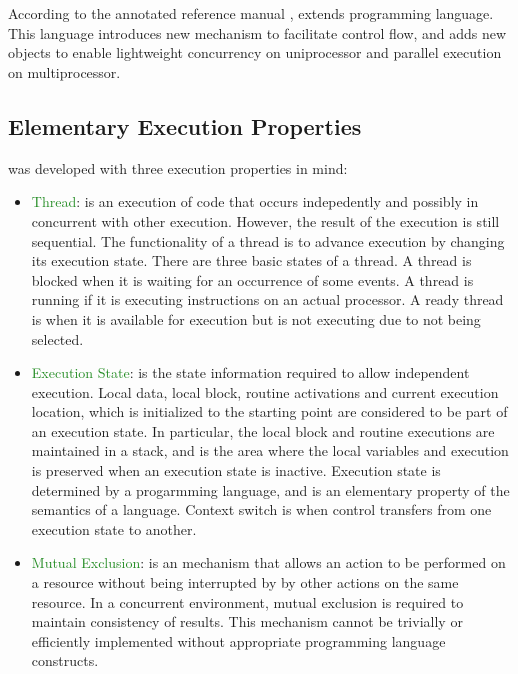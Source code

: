 \chapter{\uCPP} \label{uCPP}

According to the \uCPPS annotated reference manual \cite{reference10}, \uCPPS
extends \CCS programming language. This language introduces new mechanism to
facilitate control flow, and adds new objects to enable lightweight concurrency
on uniprocessor and parallel execution on multiprocessor.

\section{Elementary Execution Properties}
\uCPPS was developed with three execution properties in mind:
\begin{itemize}
\item \textcolor{ForestGreen}{Thread}: is an execution of code that occurs
indepedently and possibly in concurrent with other execution. However, the
result of the execution is still sequential. The functionality of a thread is to
advance execution by changing its execution state. There are three basic states
of a thread. A thread is blocked when it is waiting for an occurrence of some
events. A thread is running if it is executing instructions on an actual
processor. A ready thread is when it is available for execution but is not
executing due to not being selected.
\item \textcolor{ForestGreen}{Execution State}: is the state information required
    to allow independent execution. Local data, local block, routine activations
    and current execution location, which is initialized to the starting point are considered to be part of an execution
    state. In particular, the local block and routine executions are maintained in a
    stack, and is the area where the local variables and execution is preserved
    when an execution state is inactive. Execution state is determined by a progarmming language, and is an elementary property of the semantics of a
language. Context switch is when control transfers from one execution state to
another.
\item \textcolor{ForestGreen}{Mutual Exclusion}: is an mechanism that allows an
    action to be performed on a resource without being interrupted by by other
    actions on the same resource. In a concurrent environment, mutual exclusion
    is required to maintain consistency of results. This mechanism cannot be
    trivially or efficiently implemented without appropriate programming
    language constructs.
\end{itemize}

